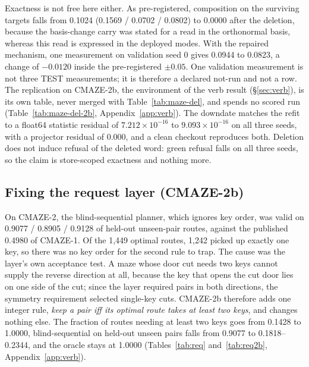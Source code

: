 \documentclass{article} %
\newcommand{\sci}[2]{\ensuremath{#1\times10^{#2}}}
\begin{document}
\noindent Exactness is not free here either. As pre-registered, composition on the surviving
targets falls from 0.1024 (0.1569 / 0.0702 / 0.0802) to 0.0000 after the deletion, because the
basis-change carry was stated for a read in the orthonormal basis, whereas this read is expressed
in the deployed modes. With the repaired mechanism, one measurement on validation seed 0 gives
0.0944 to 0.0823, a change of $-0.0120$ inside the pre-registered $\pm0.05$. One validation
measurement is not three TEST measurements; it is therefore a declared not-run and not a row.
The replication on CMAZE-2b, the environment of the verb result (\S\ref{sec:verb}), is its own
table, never merged with Table~\ref{tab:maze-del}, and spends no scored run (Table~\ref{tab:maze-del-2b},
Appendix~\ref{app:verb}).
The downdate matches the refit to a float64 statistic residual of \sci{7.212}{-16} to
\sci{9.093}{-16} on all three seeds, with a projector residual of 0.000, and a clean checkout
reproduces both. Deletion does not induce refusal of the deleted word: green refusal falls on all
three seeds, so the claim is store-scoped exactness and nothing more.

\subsection{Fixing the request layer (CMAZE-2b)}
\label{sec:req-layer}

On CMAZE-2, the blind-sequential planner, which ignores key order, was valid on 0.9077 /
0.8905 / 0.9128 of held-out unseen-pair routes, against the published 0.4980 of CMAZE-1. Of
the 1,449 optimal routes, 1,242 picked up exactly one key, so there was no key order for the
second rule to trap. %
The cause was the layer's own acceptance test. A maze whose door cut needs two keys cannot
supply the reverse direction at all, because the key that opens the cut door lies on one side
of the cut; since the layer required pairs in both directions, the symmetry requirement selected
single-key cuts. %
CMAZE-2b therefore adds one integer rule, \emph{keep a pair iff its optimal route takes at least
two keys}, and changes nothing else. The fraction of routes needing at least two keys goes from
0.1428 to 1.0000, blind-sequential on held-out unseen pairs falls from 0.9077 to 0.1818--0.2344,
and the oracle stays at 1.0000 (Tables~\ref{tab:req} and~\ref{tab:req2b}, Appendix~\ref{app:verb}). %
\end{document}

